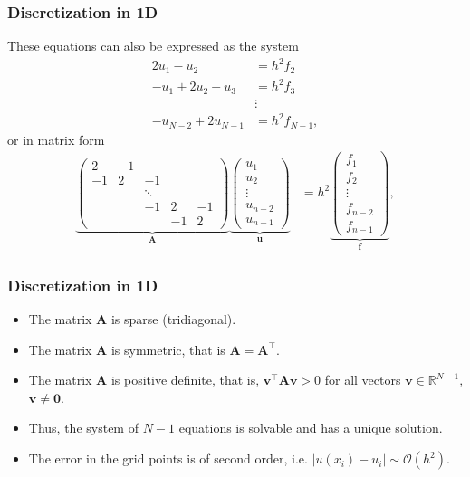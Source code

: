\begin{frame}
  \frametitle{Discretization in 1D}
  These equations can also be expressed as the system
  \begin{align*}
    2u_1 - u_2 &= h^2 f_2 \\
    -u_1 + 2u_2 - u_3 &= h^2 f_3 \\
               &\vdots \\
    -u_{N-2} + 2u_{N-1} &= h^2 f_{N-1},
  \end{align*}
  or in matrix form
  \begin{align*}
    \underbrace{ \begin{pmatrix}
      2 & -1 & & & \\
      -1 & 2 & -1 & & \\
      & & \ddots & & \\
      & & -1 & 2 & -1 \\
      & & & -1 & 2
    \end{pmatrix}
    }_{\bm A}
    \underbrace{ \begin{pmatrix}
      u_1 \\
      u_2 \\
      \vdots \\
      u_{n-2} \\
      u_{n-1}
    \end{pmatrix}
    }_{\bm u}
    &= h^2
    \underbrace{ \begin{pmatrix}
      f_1 \\
      f_2 \\
      \vdots \\
      f_{n-2} \\
      f_{n-1}
    \end{pmatrix}
    }_{\bm f} ,
  \end{align*}
\end{frame}

\begin{frame}
  \frametitle{Discretization in 1D}
  \begin{itemize}
  \item The matrix $\bm A$ is sparse (tridiagonal).
  \item The matrix $\bm A$ is symmetric, that is $\bm A = \bm A^\intercal$.
  \item The matrix $\bm A$ is positive definite, that is,
    $\bm v^\intercal \bm A \bm v > 0$
    for all vectors $\bm v \in \mathbb{R}^{N-1}$, $\bm v \not= \bm 0$.
  \item Thus, the system of $N-1$ equations is solvable and has a unique
    solution.
  \item The error in the grid points is of second order, i.e.
    $|u(x_i)-u_i| \sim \mathcal{O}(h^2)$.
  \end{itemize}
\end{frame}


